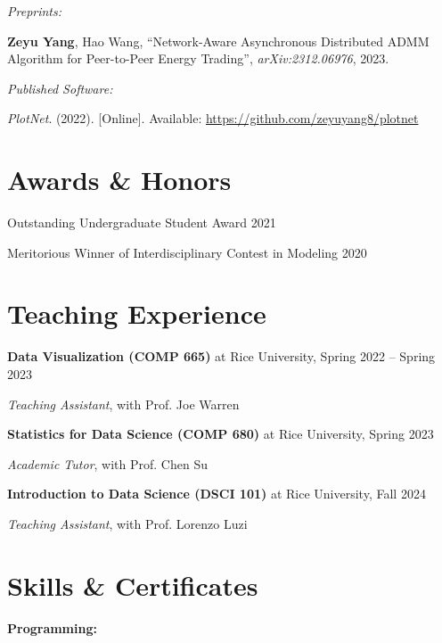 \documentclass[11pt]{article}
\begin{document}
\textit{Preprints:}

\begin{enumerate}[resume, label={[\arabic*]}]
    \item \label{hao-admm} \textbf{Zeyu Yang}, Hao Wang, 
    ``Network-Aware Asynchronous Distributed ADMM Algorithm for Peer-to-Peer Energy Trading'', \textit{arXiv:2312.06976}, 2023.
\end{enumerate}

\vspace{\lineskip}

\textit{Published Software:}

\begin{enumerate}[resume, label={[\arabic*]}]
    \item \label{joe-plotnet} \textit{PlotNet}. (2022). [Online]. Available: \url{https://github.com/zeyuyang8/plotnet}
\end{enumerate}

\section*{Awards \& Honors}

Outstanding Undergraduate Student Award \hfill 2021

Meritorious Winner of Interdisciplinary Contest in Modeling \hfill 2020

\section*{Teaching Experience}

\textbf{Data Visualization (COMP 665)} at Rice University, \hfill Spring 2022 -- Spring 2023

\textit{Teaching Assistant}, with Prof. Joe Warren

\vspace{\lineskip}

\textbf{Statistics for Data Science (COMP 680)} at Rice University, \hfill Spring 2023

\textit{Academic Tutor}, with Prof. Chen Su

\vspace{\lineskip}

\textbf{Introduction to Data Science (DSCI 101)} at Rice University, \hfill Fall 2024

\textit{Teaching Assistant}, with Prof. Lorenzo Luzi

\section*{Skills \& Certificates}
\textbf{Programming:}
\end{document}

